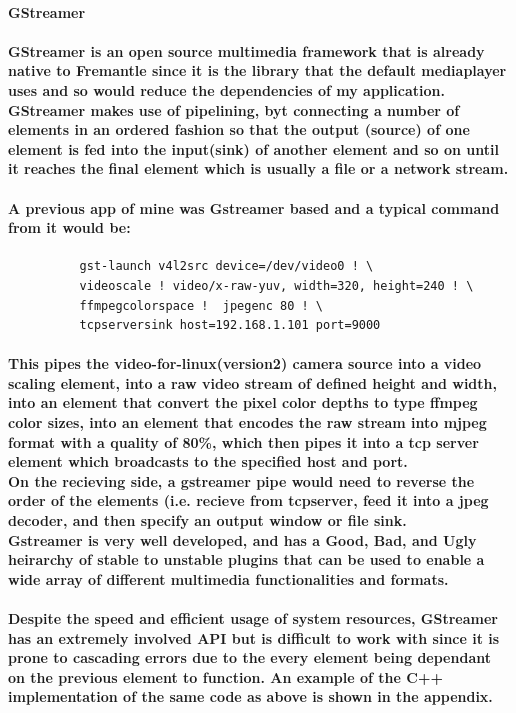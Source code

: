 \documentclass[11pt]{article} %
\begin{document}
\paragraph{\bf{GStreamer}}
\paragraph{GStreamer is an open source multimedia framework that is already native to Fremantle since it is the library that the default mediaplayer uses and so would reduce the dependencies of my application. GStreamer makes use of pipelining, byt connecting a number of elements in an ordered fashion so that the output (source) of one element is fed into the input(sink) of another element and so on until it reaches the final element which is usually a file or a network stream.
\\\\A previous app of mine was Gstreamer based and a typical command from it would be:
}
\begin{verbatim}
	      gst-launch v4l2src device=/dev/video0 ! \
	      videoscale ! video/x-raw-yuv, width=320, height=240 ! \
	      ffmpegcolorspace !  jpegenc 80 ! \
	      tcpserversink host=192.168.1.101 port=9000
\end{verbatim}
\paragraph{This pipes the video-for-linux(version2) camera source into a video scaling element, into a raw video stream of defined height and width, into an element that convert the pixel color depths to type ffmpeg color sizes, into an element that encodes the raw stream into mjpeg format with a quality of 80\%, which then pipes it into a tcp server element which broadcasts to the specified host and port.
\\On the recieving side, a gstreamer pipe would need to reverse the order of the elements (i.e. recieve from tcpserver, feed it into a jpeg decoder, and then specify an output window or file sink.
\\Gstreamer is very well developed, and has a Good, Bad, and Ugly heirarchy of stable to unstable plugins that can be used to enable a wide array of different multimedia functionalities and formats.
}
\paragraph{Despite the speed and efficient usage of system resources, GStreamer has an extremely involved API but is difficult to work with since it is prone to cascading errors due to the every element being dependant on the previous element to function. An example of the C++ implementation of the same code as above is shown in the appendix.}
\end{document}
